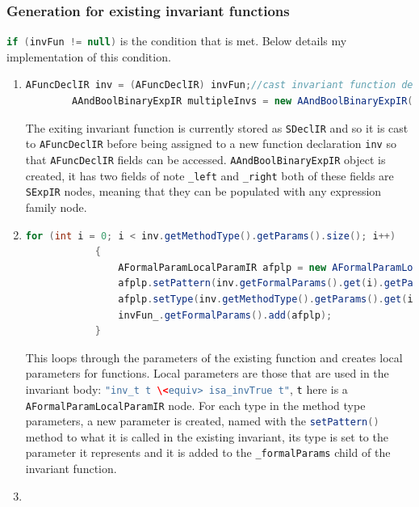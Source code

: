 	\subsubsection{Generation for existing invariant functions}
	\lstinline[language=Java]{if (invFun != null)} is the condition that is met. Below details my implementation of this condition.
	\begin{enumerate}
		\item \begin{lstlisting}[language=Java]
		AFuncDeclIR inv = (AFuncDeclIR) invFun;//cast invariant function declaration to AFuncDeclIR
        AAndBoolBinaryExpIR multipleInvs = new AAndBoolBinaryExpIR();
		\end{lstlisting}
		The exiting invariant function is currently stored as \lstinline[language=Java]{SDeclIR} and so it is cast to \lstinline[language=Java]{AFuncDeclIR} before being assigned to a new function declaration \lstinline[language=Java]{inv} so that \lstinline[language=Java]{AFuncDeclIR} fields can be accessed. \lstinline[language=Java]{AAndBoolBinaryExpIR} object is created, it has two fields of note \lstinline[language=Java]{_left} and \lstinline[language=Java]{_right} both of these fields are \lstinline[language=Java]{SExpIR} nodes, meaning that they can be populated with any expression family node.
		\item \begin{lstlisting}[language=Java] 
		for (int i = 0; i < inv.getMethodType().getParams().size(); i++)
        	{
	        	AFormalParamLocalParamIR afplp = new AFormalParamLocalParamIR();
	            afplp.setPattern(inv.getFormalParams().get(i).getPattern());
	            afplp.setType(inv.getMethodType().getParams().get(i).clone());
	            invFun_.getFormalParams().add(afplp);
        	}
		\end{lstlisting} 
		This loops through the parameters of the existing function and creates local parameters for functions. Local parameters are those that are used in the invariant body: \lstinline[language=Java]{"inv_t t \<equiv> isa_invTrue t"}, \lstinline[language=Java]{t} here is a \lstinline[language=Java]{AFormalParamLocalParamIR} node. For each type in the method type parameters, a new parameter is created, named with the \lstinline[language=Java]{setPattern()} method to what it is called in the existing invariant, its type is set to the parameter it represents and it is added to the \lstinline[language=Java]{_formalParams} child of the invariant function.
		\item \begin{lstlisting}[language=Java]

\end{lstlisting}
\end{enumerate}

